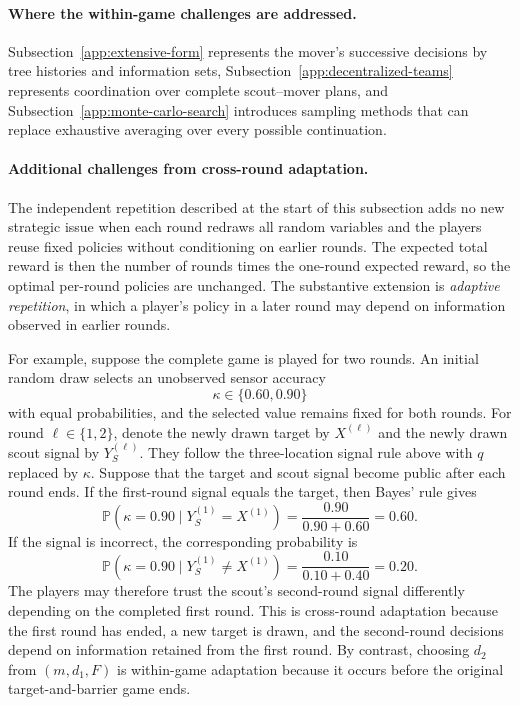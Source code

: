 \paragraph{Where the within-game challenges are addressed.}
Subsection~\ref{app:extensive-form} represents the mover's successive decisions by tree histories and information sets, Subsection~\ref{app:decentralized-teams} represents coordination over complete scout--mover plans, and Subsection~\ref{app:monte-carlo-search} introduces sampling methods that can replace exhaustive averaging over every possible continuation.

\paragraph{Additional challenges from cross-round adaptation.}
The independent repetition described at the start of this subsection adds no new strategic issue when each round redraws all random variables and the players reuse fixed policies without conditioning on earlier rounds. The expected total reward is then the number of rounds times the one-round expected reward, so the optimal per-round policies are unchanged. The substantive extension is \emph{adaptive repetition}, in which a player's policy in a later round may depend on information observed in earlier rounds.

For example, suppose the complete game is played for two rounds. An initial random draw selects an unobserved sensor accuracy
\[
    \kappa\in\{0.60,0.90\}
\]
with equal probabilities, and the selected value remains fixed for both rounds. For round $\ell\in\{1,2\}$, denote the newly drawn target by $X^{(\ell)}$ and the newly drawn scout signal by $Y_S^{(\ell)}$. They follow the three-location signal rule above with $q$ replaced by $\kappa$. Suppose that the target and scout signal become public after each round ends. If the first-round signal equals the target, then Bayes' rule gives
\[
    \mathbb{P}(\kappa=0.90\mid Y_S^{(1)}=X^{(1)})
    =
    \frac{0.90}{0.90+0.60}
    =
    0.60.
\]
If the signal is incorrect, the corresponding probability is
\[
    \mathbb{P}(\kappa=0.90\mid Y_S^{(1)}\neq X^{(1)})
    =
    \frac{0.10}{0.10+0.40}
    =
    0.20.
\]
The players may therefore trust the scout's second-round signal differently depending on the completed first round. This is cross-round adaptation because the first round has ended, a new target is drawn, and the second-round decisions depend on information retained from the first round. By contrast, choosing $d_2$ from $(m,d_1,F)$ is within-game adaptation because it occurs before the original target-and-barrier game ends.

